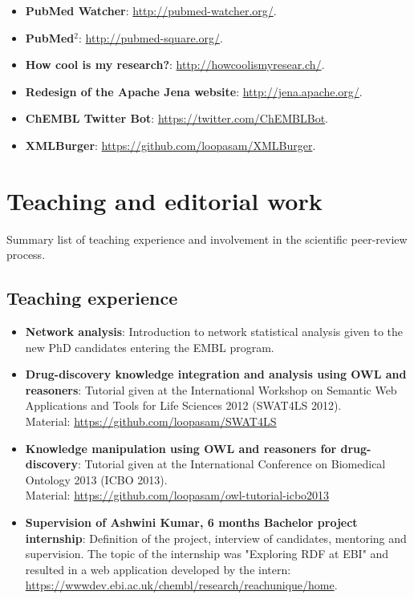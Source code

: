 \begin{itemize}
  \item \textbf{PubMed Watcher}: \url{http://pubmed-watcher.org/}.
  \item \textbf{PubMed$^{2}$}: \url{http://pubmed-square.org/}.
  \item \textbf{How cool is my research?}: \url{http://howcoolismyresear.ch/}.
  \item \textbf{Redesign of the Apache Jena website}: \url{http://jena.apache.org/}.
  \item \textbf{ChEMBL Twitter Bot}: \url{https://twitter.com/ChEMBLBot}.
  \item \textbf{XMLBurger}: \url{https://github.com/loopasam/XMLBurger}.
\end{itemize}

\chapter{Teaching and editorial work}
Summary list of teaching experience and involvement in the scientific peer-review process.
\section{Teaching experience}
\begin{itemize}
  \item \textbf{Network analysis}: Introduction to network statistical analysis given to the new PhD candidates entering the EMBL program. 
  \item \textbf{Drug-discovery knowledge integration and analysis using OWL and reasoners}: Tutorial given at the International Workshop on Semantic Web Applications and Tools for Life Sciences 2012 (SWAT4LS 2012). \\ Material: \url{https://github.com/loopasam/SWAT4LS}
  \item \textbf{Knowledge manipulation using OWL and reasoners for drug-discovery}: Tutorial given at the International Conference on Biomedical Ontology 2013 (ICBO 2013). \\ Material: \url{https://github.com/loopasam/owl-tutorial-icbo2013}
  \item \textbf{Supervision of Ashwini Kumar, 6 months Bachelor project internship}: Definition of the project, interview of candidates, mentoring and supervision. The topic of the internship was "Exploring RDF at EBI" and resulted in a web application developed by the intern: \url{https://wwwdev.ebi.ac.uk/chembl/research/reachunique/home}.
\end{itemize}

